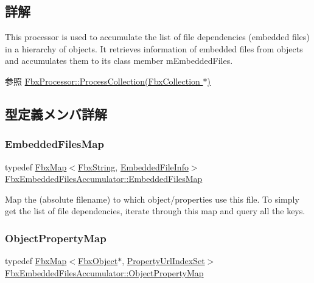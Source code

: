 \subsection{詳解}
This processor is used to accumulate the list of file dependencies (embedded files) in a hierarchy of objects. It retrieves information of embedded files from objects and accumulates them to its class member m\+Embedded\+Files. \begin{DoxySeeAlso}{参照}
\hyperlink{class_fbx_processor_acb7f2a7c80e823b16d2639d7293fefb3}{Fbx\+Processor\+::\+Process\+Collection(\+Fbx\+Collection $\ast$)} 
\end{DoxySeeAlso}


\subsection{型定義メンバ詳解}
\mbox{\label{class_fbx_embedded_files_accumulator_a7471092a2496b1e45a263f91ea3db731}} 
\subsubsection{\texorpdfstring{Embedded\+Files\+Map}{EmbeddedFilesMap}}
{\footnotesize\ttfamily typedef \hyperlink{class_fbx_map}{Fbx\+Map}$<$\hyperlink{class_fbx_string}{Fbx\+String}, \hyperlink{struct_fbx_embedded_files_accumulator_1_1_embedded_file_info}{Embedded\+File\+Info}$>$ \hyperlink{class_fbx_embedded_files_accumulator_a7471092a2496b1e45a263f91ea3db731}{Fbx\+Embedded\+Files\+Accumulator\+::\+Embedded\+Files\+Map}}

Map the (absolute filename) to which object/properties use this file. To simply get the list of file dependencies, iterate through this map and query all the keys. \mbox{\label{class_fbx_embedded_files_accumulator_abc919e5ba3486530790dcd7ef90b8eed}} 
\subsubsection{\texorpdfstring{Object\+Property\+Map}{ObjectPropertyMap}}
{\footnotesize\ttfamily typedef \hyperlink{class_fbx_map}{Fbx\+Map}$<$\hyperlink{class_fbx_object}{Fbx\+Object}$\ast$, \hyperlink{class_fbx_embedded_files_accumulator_a007ad10c417fc8b5373ab6358f5fb5be}{Property\+Url\+Index\+Set}$>$ \hyperlink{class_fbx_embedded_files_accumulator_abc919e5ba3486530790dcd7ef90b8eed}{Fbx\+Embedded\+Files\+Accumulator\+::\+Object\+Property\+Map}}

